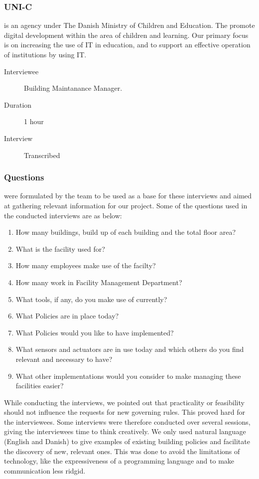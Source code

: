 \subsubsection{UNI-C} is an agency under The Danish Ministry of Children and Education. The promote digital development within the area of children and learning. Our primary focus is on increasing the use of IT in education, and to support an effective operation of institutions by using IT.
  
\begin{description}
	\item[Interviewee] Building Maintanance Manager.
	\item[Duration] 1 hour
	\item[Interview] Transcribed
\end{description}

\subsubsection{Questions} were formulated by the team to be used as a base for these interviews and aimed at gathering relevant information for our project. Some of the questions used in the conducted interviews are as below:
\begin{enumerate}
	\item How many buildings, build up of each building and the total floor area?
	\item What is the facility used for? 
	\item How many employees make use of the facilty?
	\item How many work in Facility Management Department?
	\item What tools, if any, do you make use of currently?
	\item What Policies are in place today?
	\item What Policies would you like to have implemented?
	\item What sensors and actuators are in use today and which others do you find relevant and necessary to have?
	\item What other implementations would you consider to make managing these facilities easier?
\end{enumerate}

While conducting the interviews, we pointed out that practicality or feasibility should not influence the requests for new governing rules. This proved hard for the interviewees. Some interviews were therefore conducted over several sessions, giving the interviewees time to think creatively. We only used natural language (English and Danish) to give examples of existing building policies and facilitate the discovery of new, relevant ones. This was done to avoid the limitations of technology, like the expressiveness of a programming language and to make communication less ridgid.\\ 


